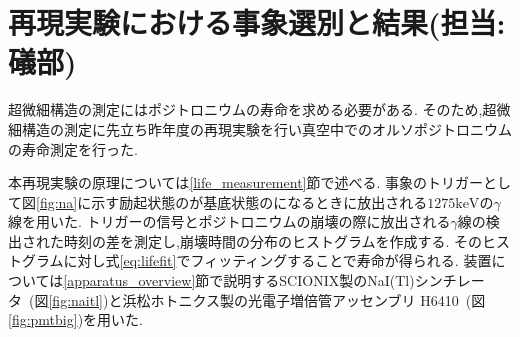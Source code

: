 \chapter{再現実験における事象選別と結果(担当:礒部)}\label{result}

超微細構造の測定にはポジトロニウムの寿命を求める必要がある.
そのため,超微細構造の測定に先立ち昨年度の再現実験を行い真空中でのオルソポジトロニウムの寿命測定を行った.

本再現実験の原理については\ref{life_measurement}節で述べる.
事象のトリガーとして図\ref{fig:na}に示す励起状態のが基底状態のになるときに放出される$1275\si{\kilo\electronvolt}$の$\gamma$線を用いた.
トリガーの信号とポジトロニウムの崩壊の際に放出される$\gamma$線の検出された時刻の差を測定し,崩壊時間の分布のヒストグラムを作成する.
そのヒストグラムに対し式\ref{eq:lifefit}でフィッティングすることで寿命が得られる.
装置については\ref{apparatus_overview}節で説明するSCIONIX製のNaI(Tl)シンチレータ~\cite{nai}(図\ref{fig:naitl})と浜松ホトニクス製の光電子増倍管アッセンブリ H6410~\cite{pmtshape}(図\ref{fig:pmtbig})を用いた.

